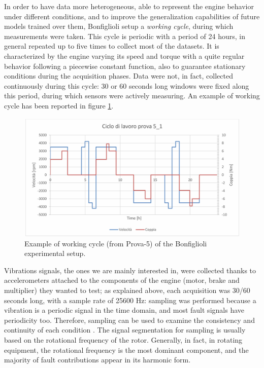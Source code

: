\documentclass[../main.tex]{subfiles}
\begin{document}
In order to have data more heterogeneous, able to represent the engine behavior under different conditions, and to improve the generalization capabilities of future models trained over them, Bonfiglioli setup a \textit{working cycle}, during which measurements were taken. This cycle is periodic with a period of 24 hours, in general repeated up to five times to collect most of the datasets. It is characterized by the engine varying its speed and torque with a quite regular behavior following a piecewise constant function, also to guarantee stationary conditions during the acquisition phases. Data were not, in fact, collected continuously during this cycle: 30 or 60 seconds long windows were fixed along this period, during which sensors were actively measuring. An example of working cycle has been reported in figure \ref{fig:bonfiglioli_example_working_cycle}.
\begin{figure}[!ht]
	\centering
	\includegraphics[width=\textwidth]{pictures/bonfiglioli_example_working_cycle}
	\caption{Example of working cycle (from Prova-5) of the Bonfiglioli experimental setup.}
	\label{fig:bonfiglioli_example_working_cycle}
\end{figure}
Vibrations signals, the ones we are mainly interested in, were collected thanks to accelerometers attached to the components of the engine (motor, brake and multiplier) they wanted to test; as explained above, each acquisition was 30/60 seconds long, with a sample rate of 25600 Hz: sampling was performed because a vibration is a periodic signal in the time domain, and most fault signals have periodicity too. Therefore, sampling can be used to examine the consistency and continuity of each condition \cite{deep_learning_vibration_gravity}. The signal segmentation for sampling is usually based on the rotational frequency of the rotor. Generally, in fact, in rotating equipment, the rotational frequency is the most dominant component, and the majority of fault contributions appear in its harmonic form.
\end{document}
